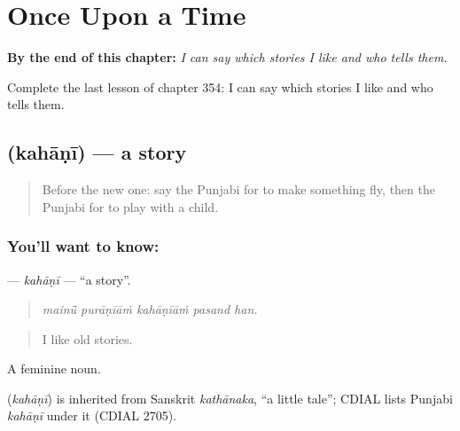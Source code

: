 
\chapter{Once Upon a Time}
\label{ch:pa-a2-once-upon-a-time}

\begin{chapteropening}
\textbf{By the end of this chapter:} \emph{I can say which stories I like and who tells them.}

Complete the last lesson of chapter 354: I can say which stories I like and who tells them.
\end{chapteropening}

\section[\texorpdfstring{\pa{ਕਹਾਣੀ} (kahāṇī)}{ਕਹਾਣੀ (kahāṇī)}]{ (kahāṇī) — a story}

\label{lesson:PA-C354-kahani}



\begin{quote}
Before the new one: say the Punjabi for to make something fly, then the Punjabi for to play with a child.
\end{quote}

\subsection*{You'll want to know: }
\textbf{} — \emph{kahāṇī} — \textquotedblleft{}a story\textquotedblright{}.

\begin{quote}
    
\end{quote}

\begin{quote}
\emph{mainū̃ purāṇīāṁ kahāṇīāṁ pasand han.}
\end{quote}

\begin{quote}
I like old stories.
\end{quote}

A feminine noun.

\begin{cousinweb}
\textbf{} (\emph{kahāṇī}) is inherited from Sanskrit \emph{kathānaka}, \textquotedblleft{}a little tale\textquotedblright{}; CDIAL lists Punjabi \emph{kahāṇī} under it (CDIAL 2705).
\end{cousinweb}


